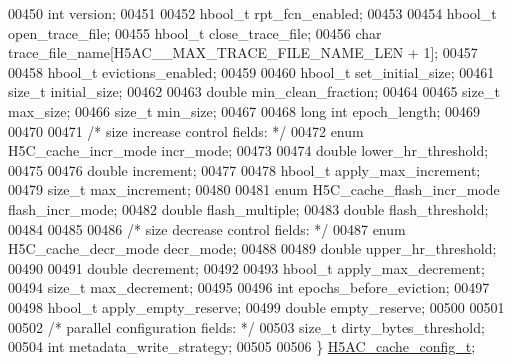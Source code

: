 \begin{DoxyCode}
00450     \textcolor{keywordtype}{int}                      version;
00451 
00452     hbool\_t          rpt\_fcn\_enabled;
00453 
00454     hbool\_t          open\_trace\_file;
00455     hbool\_t                  close\_trace\_file;
00456     \textcolor{keywordtype}{char}                     trace\_file\_name[H5AC\_\_MAX\_TRACE\_FILE\_NAME\_LEN + 1];
00457 
00458     hbool\_t                  evictions\_enabled;
00459 
00460     hbool\_t                  set\_initial\_size;
00461     \textcolor{keywordtype}{size\_t}                   initial\_size;
00462 
00463     \textcolor{keywordtype}{double}                   min\_clean\_fraction;
00464 
00465     \textcolor{keywordtype}{size\_t}                   max\_size;
00466     \textcolor{keywordtype}{size\_t}                   min\_size;
00467 
00468     \textcolor{keywordtype}{long} \textcolor{keywordtype}{int}                 epoch\_length;
00469 
00470 
00471     \textcolor{comment}{/* size increase control fields: */}
00472     \textcolor{keyword}{enum} H5C\_cache\_incr\_mode incr\_mode;
00473 
00474     \textcolor{keywordtype}{double}                   lower\_hr\_threshold;
00475 
00476     \textcolor{keywordtype}{double}                   increment;
00477 
00478     hbool\_t                  apply\_max\_increment;
00479     \textcolor{keywordtype}{size\_t}                   max\_increment;
00480 
00481     \textcolor{keyword}{enum} H5C\_cache\_flash\_incr\_mode      flash\_incr\_mode;
00482     \textcolor{keywordtype}{double}                              flash\_multiple;
00483     \textcolor{keywordtype}{double}                              flash\_threshold;
00484 
00485 
00486     \textcolor{comment}{/* size decrease control fields: */}
00487     \textcolor{keyword}{enum} H5C\_cache\_decr\_mode decr\_mode;
00488 
00489     \textcolor{keywordtype}{double}                   upper\_hr\_threshold;
00490 
00491     \textcolor{keywordtype}{double}                   decrement;
00492 
00493     hbool\_t                  apply\_max\_decrement;
00494     \textcolor{keywordtype}{size\_t}                   max\_decrement;
00495 
00496     \textcolor{keywordtype}{int}                      epochs\_before\_eviction;
00497 
00498     hbool\_t                  apply\_empty\_reserve;
00499     \textcolor{keywordtype}{double}                   empty\_reserve;
00500 
00501 
00502     \textcolor{comment}{/* parallel configuration fields: */}
00503     \textcolor{keywordtype}{size\_t}                   dirty\_bytes\_threshold;
00504     \textcolor{keywordtype}{int}                      metadata\_write\_strategy;
00505 
00506 \} \hyperlink{struct_h5_a_c__cache__config__t}{H5AC\_cache\_config\_t};

\end{DoxyCode}
